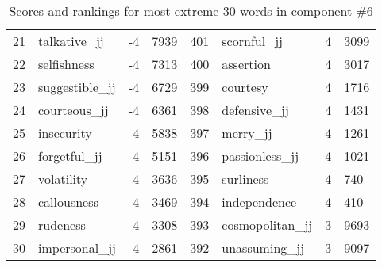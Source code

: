 \begin{table}[tbp]
\begin{tabular}{| rlr@{.}l | rlr@{.}l |}
    21 & talkative\_jj & -4 & 7939    &    401 & scornful\_jj & 4 & 3099 \\
    22 & selfishness & -4 & 7313    &    400 & assertion & 4 & 3017 \\
    23 & suggestible\_jj & -4 & 6729    &    399 & courtesy & 4 & 1716 \\
    24 & courteous\_jj & -4 & 6361    &    398 & defensive\_jj & 4 & 1431 \\
    25 & insecurity & -4 & 5838    &    397 & merry\_jj & 4 & 1261 \\
    26 & forgetful\_jj & -4 & 5151    &    396 & passionless\_jj & 4 & 1021 \\
    27 & volatility & -4 & 3636    &    395 & surliness & 4 & 740 \\
    28 & callousness & -4 & 3469    &    394 & independence & 4 & 410 \\
    29 & rudeness & -4 & 3308    &    393 & cosmopolitan\_jj & 3 & 9693 \\
    30 & impersonal\_jj & -4 & 2861    &    392 & unassuming\_jj & 3 & 9097 \\
    \hline
    \end{tabular}
    \caption{Scores and rankings for most extreme 30 words in component \#6} 
\end{table}
\clearpage
